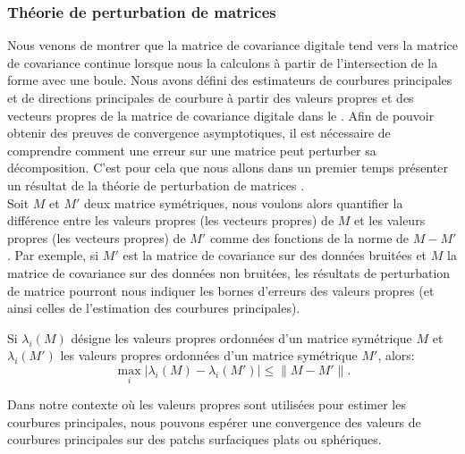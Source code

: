 \subsubsection{Théorie de perturbation de matrices}
%
Nous venons de montrer que la matrice de covariance digitale tend vers la
matrice de covariance continue lorsque nous la calculons à partir de
l'intersection de la forme avec une boule. Nous avons défini des estimateurs de
courbures principales et de directions principales de courbure à partir des
valeurs propres et des vecteurs propres de la matrice de covariance digitale
dans le . Afin de pouvoir obtenir des
preuves de convergence asymptotiques, il est nécessaire de comprendre comment une
erreur sur une matrice peut perturber sa décomposition. C'est pour cela que nous
allons dans un premier temps présenter un résultat de la théorie de perturbation
de matrices \cite{Bauer1960,Stewart1990,Bhatia1997}.
%
\\
%
Soit $M$ et $M'$ deux matrice symétriques, nous voulons alors quantifier la
différence entre les valeurs propres (\respp les vecteurs propres) de $M$ et les
valeurs propres (\resp les vecteurs propres) de $M'$ comme des fonctions de la
norme de $M - M'$. Par exemple, si $M'$ est la matrice de covariance sur des
données bruitées et $M$ la matrice de covariance sur des données non bruitées,
les résultats de perturbation de matrice pourront nous indiquer les bornes
d'erreurs des valeurs propres (et ainsi celles de l'estimation des courbures
principales).
%
\begin{theorem}
  \label{thm:lidskii-weyl}
  Si $\lambda_i(M)$ désigne les valeurs propres ordonnées d'un matrice
  symétrique $M$ et $\lambda_i(M')$ les valeurs propres ordonnées d'un matrice
  symétrique $M'$, alors:
  \begin{equation}
    \max_{i}| \lambda_i(M) - \lambda_i(M')| \le \|M-M'\| .
  \end{equation}
\end{theorem}
%
Dans notre contexte où les valeurs propres sont utilisées pour estimer les
courbures principales, nous pouvons espérer une convergence des valeurs de
courbures principales sur des patchs surfaciques plats ou sphériques.
%
